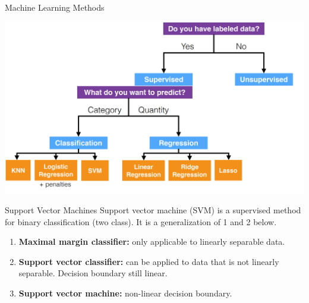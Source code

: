 

\begin{frame}{Machine Learning Methods}
    \begin{center}
        \includegraphics[width=0.95\linewidth]{images/support-vector-machines/support-vector-machines-1.png}
    \end{center}
\end{frame}


\begin{frame}{Support Vector Machines}
Support vector machine (SVM) is a supervised method for binary classification (two class). It is a generalization of 1 and 2 below.

\begin{enumerate}
    \item \textbf{Maximal margin classifier:} only applicable to linearly separable data.
    \item \textbf{Support vector classifier:} can be applied to data that is not linearly separable. Decision boundary still linear.
    \item \textbf{Support vector machine:} non-linear decision boundary.
\end{enumerate}
\end{frame}
